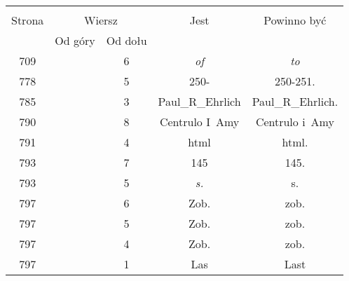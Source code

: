 \documentclass[a4paper,11pt]{article}
\begin{document}
\begin{center}
  \begin{tabular}{|c|c|c|c|c|}
    \hline
    & \multicolumn{2}{c|}{} & & \\
    Strona & \multicolumn{2}{c|}{Wiersz} & Jest
                              & Powinno być \\ \cline{2-3}
    & Od góry & Od dołu & & \\
    \hline
    709 & &  6 & \emph{of} & \emph{to} \\
    778 & &  5 & 250- & 250-251. \\
    785 & &  3 & Paul\_R\_Ehrlich & Paul\_R\_Ehrlich. \\
    790 & &  8 & Centrulo I~Amy & Centrulo i~Amy \\
    791 & &  4 & html & html. \\
    793 & &  7 & 145 & 145. \\
    793 & &  5 & \emph{s.} & s. \\
    797 & &  6 & Zob. & zob. \\
    797 & &  5 & Zob. & zob. \\
    797 & &  4 & Zob. & zob. \\
    797 & &  1 & Las & Last \\
    \hline
  \end{tabular}


\end{center}
\end{document}
